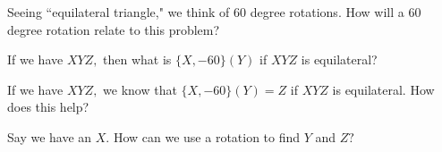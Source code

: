 
Seeing ``equilateral triangle," we think of $60$ degree rotations.  How will a $60$ degree rotation relate to this problem?

If we have $XYZ,$ then what is $\{X, -60\} (Y) $ if $XYZ$ is equilateral?



















If we have $XYZ,$ we know that $\{X, -60\} (Y) = Z$ if $XYZ$ is equilateral. How does this help?

Say we have an $X. $ How can we use a rotation to find $Y$ and $Z?$

